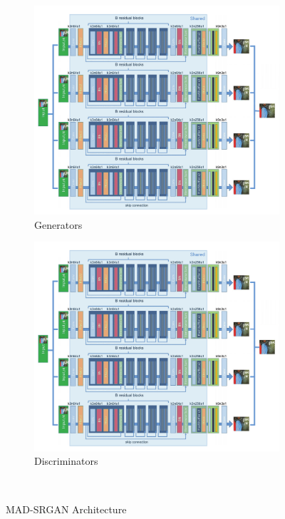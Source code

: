 \documentclass[12pt,a4paper,twocolumn]{article}
\begin{document}
        \begin{figure}
            \centering
            \begin{subfigure}{0.4\textwidth}
                \includegraphics[width=\textwidth]{images/mad-srgan-gen-arch.png}
                \caption{Generators}
            \end{subfigure}
            \begin{subfigure}{0.4\textwidth}
                \includegraphics[width=\textwidth]{images/mad-srgan-disc-arch.png}
                \caption{Discriminators}
            \end{subfigure}\\[3mm]
            \caption{MAD-SRGAN Architecture}
            \label{fig:gen-arch}
        \end{figure}
\end{document}
